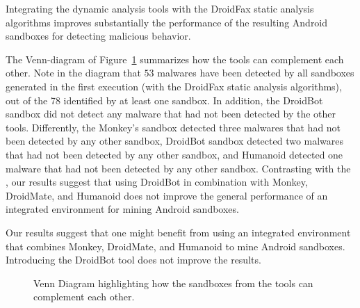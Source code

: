 \begin{finding}
  Integrating the dynamic analysis tools
  with the DroidFax static analysis algorithms
  improves substantially the performance
  of the resulting Android sandboxes for
  detecting malicious behavior. 
\end{finding}
 
The Venn-diagram of Figure~\ref{fig:venn-plot1}
summarizes how the tools can complement each other.
Note in the diagram that $53$ malwares have been detected by all sandboxes generated in the first execution (with the DroidFax static analysis algorithms), out of the 78 identified by at least one sandbox. In addition, the DroidBot sandbox did not detect any malware that had not been detected by the other tools. Differently, the Monkey's sandbox detected three malwares that had not been detected by any other sandbox, DroidBot sandbox detected two malwares that had not been detected by any other sandbox, and Humanoid detected one malware that had not been detected by any other sandbox. Contrasting with the \blls,
our results suggest that using DroidBot in combination with Monkey, DroidMate, and Humanoid does not improve the general performance of an integrated environment for mining
Android sandboxes.

\begin{finding}
  Our results suggest that one might benefit from using  an integrated
  environment that combines Monkey, DroidMate, and Humanoid to
  mine Android sandboxes. Introducing the DroidBot 
  tool does not improve the results.
\end{finding}


\begin{figure}[htb]
  \caption{Venn Diagram highlighting how the sandboxes from the tools can
    complement each other.}
  \label{fig:venn-plot1}
\end{figure}


